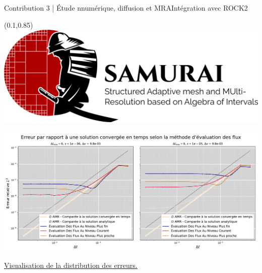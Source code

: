 \begin{frame}{Contribution 3 | Étude nnumérique, diffusion et MRA}{Intégration avec ROCK2}
    \begin{textblock*}{40pt}(0.1\paperwidth,0.85\paperheight)
        \includegraphics[scale=.03]{medias/2_/1_/light_logo.png}
    \end{textblock*}
    \centering
    \includegraphics[width= \textwidth]{medias/2_/3_/flux_reconstruction_method_diffusion.pdf}
    \centering

    \href{https://github.com/Ocelot-Pale/etude_MR_RK2}{\color{Primary} \underline{Visualisation de la distribution des erreurs.}}\color{black}
\end{frame}
